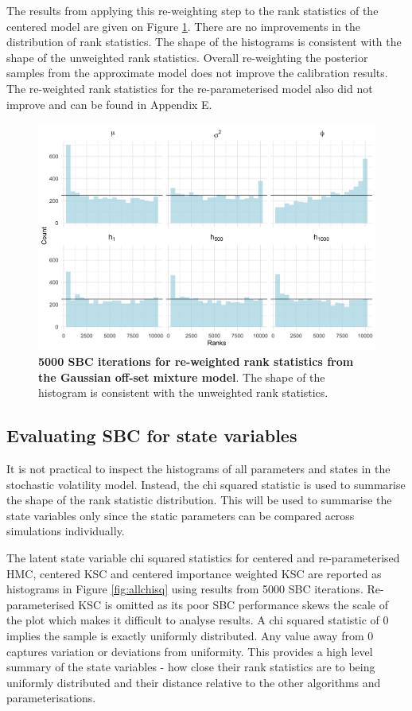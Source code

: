 \documentclass[12pt, a4paper]{article}
\begin{document}
    The results from applying this re-weighting step to the rank statistics of the centered model are given on Figure \ref{fig:reweight5k}. There are no improvements in the distribution of rank statistics. The shape of the histograms is consistent with the shape of the unweighted rank statistics. Overall re-weighting the posterior samples from the approximate model does not improve the calibration results. The re-weighted rank statistics for the re-parameterised model also did not improve and can be found in Appendix E.

    \begin{figure}[H]
        \centering
        \includegraphics[scale=0.1]{results/weighted_ksc_cp_5k.png}
        \caption{\textbf{5000 SBC iterations for re-weighted rank statistics from the Gaussian off-set mixture model}. The shape of the histogram is consistent with the unweighted rank statistics.}
        \label{fig:reweight5k}
    \end{figure}

    \subsection{Evaluating SBC for state variables}
    It is not practical to inspect the histograms of all parameters and states in the stochastic volatility model. Instead, the chi squared statistic is used to summarise the shape of the rank statistic distribution. This will be used to summarise the state variables only since the static parameters can be compared across simulations individually. 

    The latent state variable chi squared statistics for centered and re-parameterised HMC, centered KSC and centered importance weighted KSC are reported as histograms in Figure \ref{fig:allchisq} using results from 5000 SBC iterations. Re-parameterised KSC is omitted as its poor SBC performance skews the scale of the plot which makes it difficult to analyse results. A chi squared statistic of 0 implies the sample is exactly uniformly distributed. Any value away from 0 captures variation or deviations from uniformity. This provides a high level summary of the state variables - how close their rank statistics are to being uniformly distributed and their distance relative to the other algorithms and parameterisations. 
    
\end{document}

